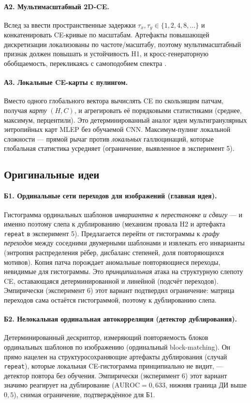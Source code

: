 \documentclass[14pt]{extarticle}
\theoremstyle{plain}
\numberwithin{equation}{section}
\numberwithin{figure}{section}
\numberwithin{table}{section}
\begin{document}
\paragraph{А2. Мультимасштабный 2D-CE.}
Вслед за \citet{zunino2016discriminating} ввести пространственные задержки
$\tau_x,\tau_y\in\{1,2,4,8,\dots\}$ и конкатенировать CE-кривые по масштабам.
Артефакты повышающей дискретизации локализованы по частоте/масштабу, поэтому
мультимасштабный признак должен повышать и устойчивость H1, и кросс-генераторную
обобщаемость, перекликаясь с самоподобием спектра \citep{tan2025fractal}.

\paragraph{А3. Локальные CE-карты с пулингом.}
Вместо одного глобального вектора вычислять CE по скользящим патчам, получая
\emph{карту} $(H,C)$, и агрегировать её порядковыми статистиками (среднее,
максимум, перцентили). Это детерминированный аналог идеи мультигранулярных
энтропийных карт MLEP \citep{yuan2025mlep} без обучаемой CNN. Максимум-пулинг
локальной сложности — прямой рычаг против \emph{локальных} галлюцинаций, которые
глобальная статистика усредняет (ограничение, выявленное в эксперимент 5).

\subsection{Оригинальные идеи}

\paragraph{Б1. Ординальные сети переходов для изображений (главная идея).}
Гистограмма ординальных шаблонов \emph{инвариантна к перестановке и сдвигу} — и
именно поэтому слепа к дублированию (механизм провала H2 и артефакта
\texttt{repeat} в эксперимент 5). Предлагается перейти от гистограммы к \emph{графу переходов}
между соседними двумерными шаблонами и извлекать его инварианты (энтропия
распределения рёбер, дисбаланс степеней, доля повторяющихся мотивов). Копия патча
порождает аномальные повторяющиеся переходы, невидимые для гистограммы. Это
\emph{принципиальная} атака на структурную слепоту CE, оставающаяся
детерминированной и линейной (подсчёт переходов). Эмпирически (эксперимент 6) этот вариант
подтвердил ограничение: матрица переходов сама остаётся гистограммой, поэтому к
дублированию слепа.

\paragraph{Б2. Нелокальная ординальная автокорреляция (детектор дублирования).}
Детерминированный дескриптор, измеряющий повторяемость блоков ординальных шаблонов
по изображению (ординальный block-matching). Он прямо нацелен на
структуросохраняющие артефакты дублирования (случай \texttt{repeat}), которые
локальная CE-гистограмма принципиально не видит, — детектор повтора без обучения.
Эмпирически (эксперимент 6) этот вариант значимо реагирует на дублирование
($\mathrm{AUROC}=0{,}633$, нижняя граница ДИ выше $0{,}5$), снимая ограничение,
подтверждённое для Б1.
\end{document}
